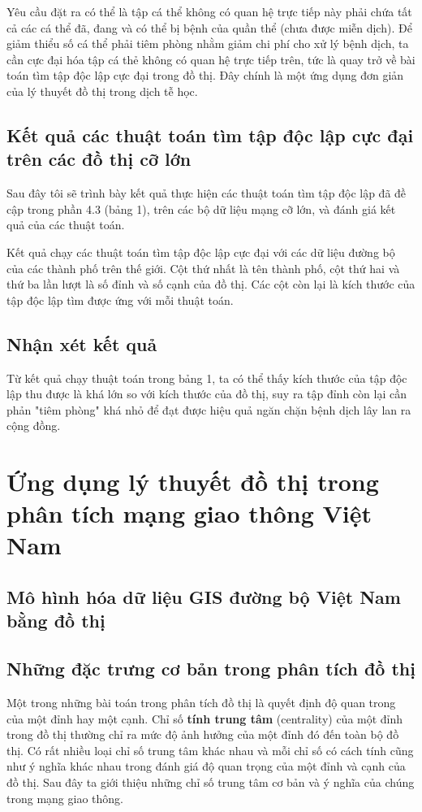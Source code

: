 \documentclass[14pt, oneside, a4paper, openany]{scrartcl}
\begin{document}
Yêu cầu đặt ra có thể là tập cá thể không có quan hệ trực tiếp này phải chứa tất cả các cá thể đã, đang và có thể bị bệnh của quần thể (chưa được miễn dịch). Để giảm thiểu số cá thể phải tiêm phòng nhằm giảm chi phí cho xử lý bệnh dịch, ta cần cực đại hóa tập cá thẻ không có quan hệ trực tiếp trên, tức là quay trở về bài toán tìm tập độc lập cực đại trong đồ thị.
Đây chính là một ứng dụng đơn giản của lý thuyết đồ thị trong dịch tễ học.

\subsection{Kết quả các thuật toán tìm tập độc lập cực đại trên các đồ thị cỡ lớn}
Sau đây tôi sẽ trình bày kết quả thực hiện các thuật toán tìm tập độc lập đã đề cập trong phần 4.3 (bảng 1), trên các bộ dữ liệu mạng cỡ lớn, và đánh giá kết quả của các thuật toán.

\begin{table}[!h]
	\caption[độ chính xác của các phương pháp trên các dữ liệu kiểm thử]{Kết quả chạy các thuật toán tìm tập độc lập cực đại với các dữ liệu đường bộ của các thành phố trên thế giới. Cột thứ nhất là tên thành phố, cột thứ hai và thứ ba lần lượt là số đỉnh và số cạnh của đồ thị. Các cột còn lại là kích thước của tập độc lập tìm được ứng với mỗi thuật toán.}
	\centering
\end{table}

\subsection{Nhận xét kết quả}
Từ kết quả chạy thuật toán trong bảng 1, ta có thể thấy kích thước của tập độc lập thu được là khá lớn so với kích thước của đồ thị, suy ra tập đỉnh còn lại cần phản "tiêm phòng" khá nhỏ để đạt được hiệu quả ngăn chặn bệnh dịch lây lan ra cộng đồng.

\newpage
\section{Ứng dụng lý thuyết đồ thị trong phân tích mạng giao thông Việt Nam}

\subsection{Mô hình hóa dữ liệu GIS đường bộ Việt Nam bằng đồ thị}

\subsection{Những đặc trưng cơ bản trong phân tích đồ thị}
Một trong những bài toán trong phân tích đồ thị là quyết định độ quan trong của một đỉnh hay một cạnh. Chỉ số \textbf{tính trung tâm}  (centrality) của một đỉnh trong đồ thị thường chỉ ra mức độ ảnh hưởng của một đỉnh đó đến toàn bộ đồ thị. Có rất nhiều loại chỉ số trung tâm khác nhau và mỗi chỉ số có cách tính cũng như ý nghĩa khác nhau trong đánh giá độ quan trọng của một đỉnh và cạnh của đồ thị. Sau đây ta giới thiệu những chỉ số trung tâm cơ bản và ý nghĩa của chúng trong mạng giao thông.
\end{document}
